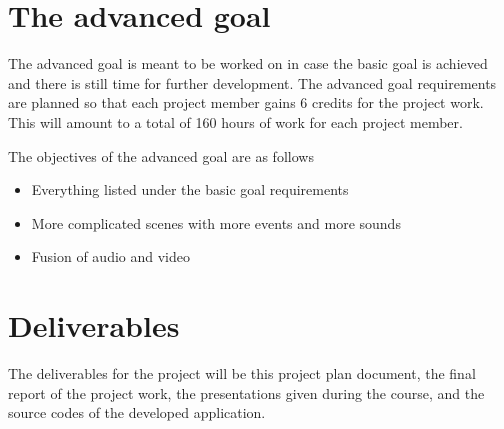 \section{The advanced goal}

The advanced goal is meant to be worked on in case the basic goal is achieved and there is still time for further development. The advanced goal requirements are planned so that each project member gains 6 credits for the project work. This will amount to a total of 160 hours of work for each project member. 

The objectives of the advanced goal are as follows

\begin{itemize}
	\item Everything listed under the basic goal requirements
	\item More complicated scenes with more events and more sounds
	\item Fusion of audio and video
\end{itemize} 


\section{Deliverables}

The deliverables for the project will be this project plan document, the final report of the project work, the presentations given during the course, and the source codes of the developed application. 